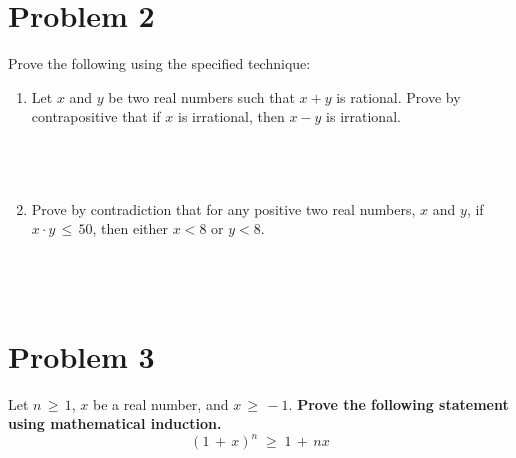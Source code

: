 \documentclass{amsart}
\theoremstyle{definition}
\theoremstyle{Exercise}
\theoremstyle{remark}
\theoremstyle{rule}
\numberwithin{equation}{section}
\begin{document}
  \section*{Problem 2}
  Prove the following using the specified technique:
  \begin{enumerate}[label=(\alph*)]
    \item Let $x$ and $y$ be two real numbers such that $x + y$ is rational. Prove by contrapositive that if $x$ is irrational, then $x - y$ is irrational.
          \\\\
\\\\
    \item Prove by contradiction that for any positive two real numbers, $x$ and $y$,
         if $x\cdot y\, \leq \,50$, then either $x < 8$ or $y < 8$.
          \\\\
\\\\
  \end{enumerate}
  \newpage
  \section*{}
  \section*{}
  \section*{Problem 3}
  Let $n\, \geq \, 1$, $x$ be a real number, and $x\, \geq\,-1$. {\bf Prove the following statement using mathematical induction.}
  \[(1\,+\,x)^n\;\geq\;1\,+\,nx\]
\\\\
\\\\
\newpage
  \section*{}
  \section*{}
\end{document}
